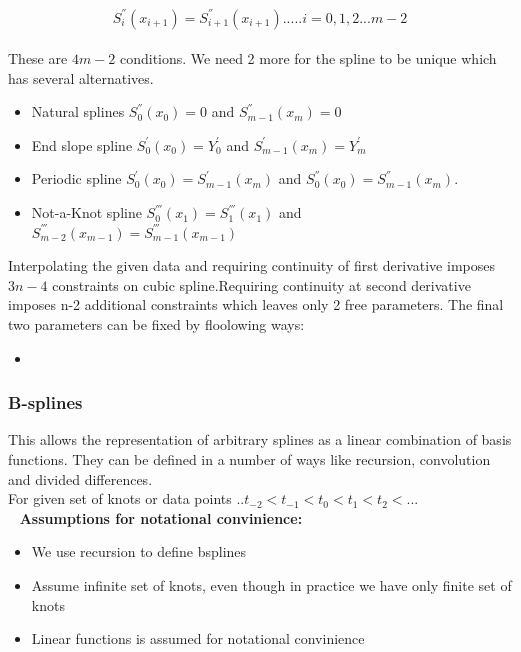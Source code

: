 \documentclass[12pt]{article}
\begin{document}
\begin{equation}
S_i ^{''}(x_{i+1}) = S^{''} _{i+1}(x_{i+1})   ..... i = 0,1,2... m-2
\end{equation}
\\
These are $4m-2$ conditions. We need 2 more for the spline to be unique which has several alternatives.

\begin{itemize}
	\item Natural splines $S^{''} _0(x_0) = 0$ and $S^{''}_{m-1}(x_m) = 0$
	\item End slope spline $S^{'} _0(x_0) = Y^{'}_0$ and $S^{'}_{m-1}(x_m) = Y^{'}_m$
	\item Periodic spline $S^{'} _0(x_0) = S^{'}_{m-1}(x_m)$ and $S^{''} _0(x_0) = S^{''}_{m-1}(x_m)$.
	\item Not-a-Knot spline $S^{'''} _0(x_1) = S^{'''} _1(x_1)$ and $S^{'''} _{m-2}(x_{m-1}) = S^{'''} _{m-1}(x_{m-1})$
\end{itemize}









Interpolating the given data and requiring continuity of first derivative imposes $3n-4$ constraints on cubic spline.Requiring continuity at second derivative imposes n-2 additional constraints which leaves only 2 free parameters. The final two parameters can be fixed by floolowing ways:
\begin{itemize}
	\item 
\end{itemize}

\subsubsection{B-splines}


This allows the representation of arbitrary splines as a linear combination of basis functions. They can be defined in a number of ways like recursion, convolution and divided differences.\\
For given set of knots or data points $..t_{-2} < t_{-1} < t_0 < t_{1} < t_{2} < ...$\\

~\newline
\textbf{Assumptions for notational convinience:}
\begin{itemize}
	\item We use recursion to define bsplines
	\item Assume infinite set of knots, even though in practice we have only finite set of knots
	\item Linear functions is assumed for notational convinience
\end{itemize}
\end{document}
